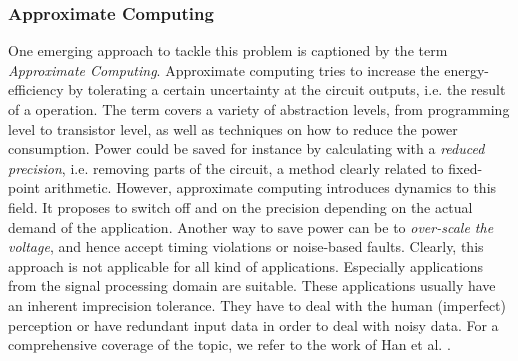 \documentclass[10pt,twocolumn]{IEEEtran} %
\begin{document}
\subsubsection*{\bf{Approximate Computing}}
One emerging approach to tackle this problem is captioned by the term \emph{Approximate Computing}. Approximate computing tries to increase the energy-efficiency by tolerating a certain uncertainty at the circuit outputs, i.e. the result of a operation. The term covers a variety of abstraction levels, from programming level to transistor level, as well as techniques on how to reduce the power consumption. Power could be saved for instance by calculating with a \emph{reduced precision}, i.e. removing parts of the circuit, a method clearly related to fixed-point arithmetic. However, approximate computing introduces dynamics to this field. It proposes to switch off and on the precision depending on the actual demand of the application. Another way to save power can be to \emph{over-scale the voltage}, and hence accept timing violations or noise-based faults. 
Clearly, this approach is not applicable for all kind of applications. Especially applications from the signal processing domain are suitable. These applications usually have an inherent imprecision tolerance. They have to deal with the human (imperfect) perception or have redundant input data in order to deal with noisy data. For a comprehensive coverage of the topic, we refer to the work of Han et al. \cite{han_approximate_2013}.
\end{document}
